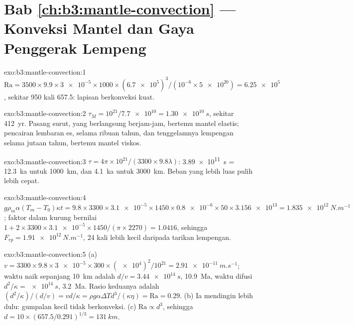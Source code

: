 \section*{Bab \ref{ch:b3:mantle-convection} --- Konveksi Mantel dan Gaya Penggerak Lempeng}

\begin{solution}{exo:b3:mantle-convection:1}
$\mathrm{Ra} = 3500\times9.9\times\num{3e-5}\times1000\times(\num{6.7e5})^3/
(10^{-6}\times\num{5e20}) = \num{6.25e5}$, sekitar 950 kali  657.5: lapisan berkonveksi kuat.
\end{solution}

\begin{solution}{exo:b3:mantle-convection:2}
$\tau_M = 10^{21}/\num{7.7e10} = \qty{1.30e10}{s}$, sekitar \qty{412}{yr}. Pasang
surut, yang berlangsung berjam-jam, bertemu mantel elastis; pencairan lembaran es,
selama ribuan tahun, dan tenggelamnya lempengan selama jutaan tahun, bertemu mantel
viskos.
\end{solution}

\begin{solution}{exo:b3:mantle-convection:3}
$\tau = 4\pi\times10^{21}/(3300\times9.8\lambda)$: \qty{3.89e11}{s} =
\qty{12.3}{ka} untuk \qty{1000}{km}, dan \qty{4.1}{ka} untuk \qty{3000}{km}. Beban
yang lebih luas pulih lebih cepat.
\end{solution}

\begin{solution}{exo:b3:mantle-convection:4}
$g\rho_m\alpha(T_m - T_0)\kappa t = 9.8\times3300\times\num{3.1e-5}\times1450
\times\num{0.8e-6}\times50\times\num{3.156e13} = \qty{1.835e12}{N.m^{-1}}$; faktor
dalam kurung bernilai $1 + 2\times3300\times\num{3.1e-5}\times1450/(\pi\times2270) = 1.0416$,
sehingga $F_{rp} = \qty{1.91e12}{N.m^{-1}}$, 24 kali lebih kecil daripada tarikan lempengan.
\end{solution}

\begin{solution}{exo:b3:mantle-convection:5}
(a) $v = 3300\times9.8\times\num{3e-5}\times300\times(\num{e4})^2/10^{21} =
\qty{2.91e-11}{m.s^{-1}}$; waktu naik sepanjang \qty{10}{km} adalah $d/v =
\qty{3.44e14}{s}$, \qty{10.9}{Ma}, waktu difusi $d^2/\kappa =
\qty{e14}{s}$, \qty{3.2}{Ma}. Rasio keduanya adalah $(d^2/\kappa)/(d/v) =
vd/\kappa = \rho g\alpha\Delta Td^3/(\kappa\eta) = \mathrm{Ra} = 0.29$. (b) Ia
mendingin lebih dulu: gumpalan kecil tidak berkonveksi. (c) $\mathrm{Ra} \propto d^3$, sehingga $d =
10\times(657.5/0.291)^{1/3} = \qty{131}{km}$.
\end{solution}

